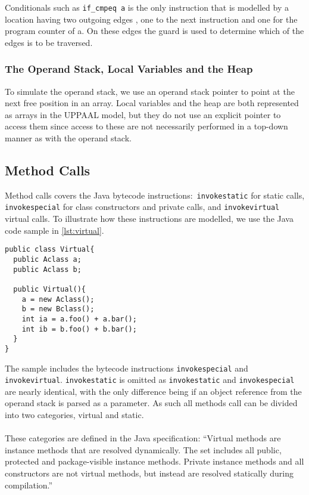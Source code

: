Conditionals such as \texttt{if\_cmpeq a} is the only instruction that is modelled by a location having two outgoing edges , one to the next instruction and one for the program counter of a. On these edges the guard is used to determine which of the edges is to be traversed. 

\subsubsection{The Operand Stack, Local Variables and the Heap}
To simulate the operand stack, we use an operand stack pointer to point at the next free position in an array. Local variables and the heap are both represented as arrays in the UPPAAL model, but they do not use an explicit pointer to access them since access to these are not necessarily performed in a top-down manner as with the operand stack.

\subsection{Method Calls}\label{subsubsec:method}
Method calls covers the Java bytecode instructions:~\texttt{invokestatic} for static calls, \texttt{invokespecial} for class constructors and private calls, and \texttt{invokevirtual} virtual calls. To illustrate how these instructions are modelled, we use the Java code sample in \cref{lst:virtual}.
\begin{lstlisting}[caption={\texttt{Bclass} extends \texttt{Aclass}, \texttt{Aclass} implements the methods foo and bar, and \texttt{Bclass} overwrites foo.}, label={lst:virtual}]
public class Virtual{
  public Aclass a;
  public Aclass b;

  public Virtual(){
    a = new Aclass();
    b = new Bclass();
    int ia = a.foo() + a.bar();
    int ib = b.foo() + b.bar();
  }
}
\end{lstlisting}
The sample includes the bytecode instructions \texttt{invokespecial} and \texttt{invokevirtual}.
\texttt{invokestatic} is omitted as \texttt{invokestatic} and \texttt{invokespecial} are nearly identical, with the only difference being if an object reference from the operand stack is parsed as a parameter.
As such all methods call can be divided into two categories, virtual and static.\\\\
These categories are defined in the Java specification: ``Virtual methods are instance methods that are resolved dynamically. The set includes all public, protected and package-visible instance methods. Private instance methods and all constructors are not virtual methods, but instead are resolved statically during compilation.''~\cite[chap. 4.3.7.6]{java_card_spec}

